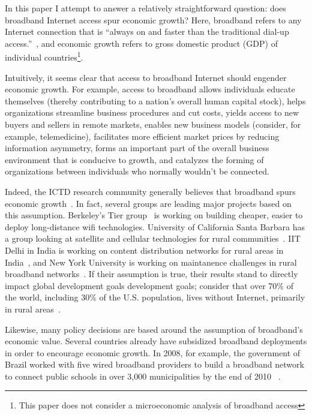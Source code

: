 In this paper I attempt to answer a relatively straightforward question: does
broadband Internet access spur economic growth? Here, broadband refers to any
Internet connection that is ``always on and faster than the traditional dial-up
access.''~\cite{fcc_bband}, and economic growth refers to gross domestic
product (GDP) of individual countries\footnote{This paper does not consider
a microeconomic analysis of broadband access}.

Intuitively, it seems clear that access to broadband Internet should engender
economic growth. For example, access to
broadband allows individuals educate themselves (thereby contributing to a
nation's overall human capital stock), helps organizations streamline business
procedures and cut costs, yields access to new buyers and sellers in remote markets,
enables new business models (consider, for example, telemedicine),
facilitates more efficient market prices by reducing
information asymmetry, forms an important part of the overall business environment
that is conducive to growth, and catalyzes the forming of
organizations between individuals who normally wouldn’t be connected.

Indeed, the ICTD research community generally believes that broadband
spurs economic growth~\cite{brewer2005case}. In fact, several groups are leading major
projects based on this assumption. Berkeley's Tier group~\cite{tier} is working on
building cheaper, easier to deploy long-distance wifi technologies. University of California Santa Barbara has a
group looking at satellite and cellular technologies for rural communities~\cite{ucsb}.
IIT Delhi in India is working on content distribution networks for rural areas
in India~\cite{mahla2012motivation}, and New York University is working on
maintanence challenges in rural broadband networks~\cite{surana2008beyond}.
If their assumption is true, their results stand to directly impact global
development goals development goals; consider that over 70\% of the world, including
30\% of the U.S. population, lives without Internet, primarily in rural areas~\cite{rural_stats}.

Likewise, many policy decisions are based around the assumption of broadband's
economic value. Several countries already have subsidized broadband deployments
in order to encourage economic growth. In 2008, for example, the government of Brazil worked with
five wired broadband providers to build a broadband network to connect public
schools in over 3,000 municipalities by the end of 2010 ~\cite{gazeta}.

